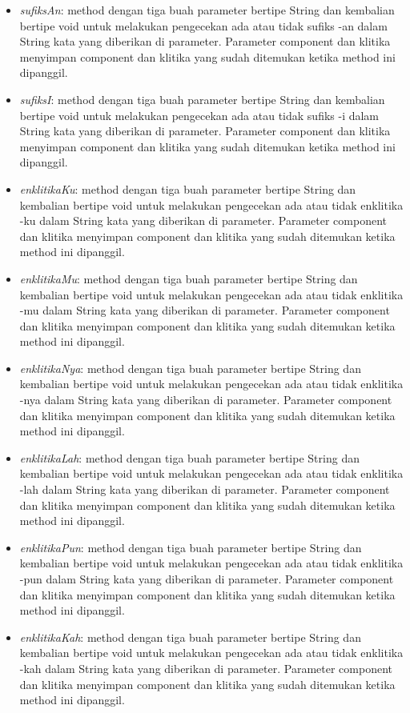 \begin{itemize}
	\item \textit{sufiksAn}: method dengan tiga buah parameter bertipe String dan kembalian bertipe void untuk melakukan pengecekan ada atau tidak sufiks -an dalam String kata yang diberikan di parameter. Parameter component dan klitika menyimpan component dan klitika yang sudah ditemukan ketika method ini dipanggil.
	\item \textit{sufiksI}: method dengan tiga buah parameter bertipe String dan kembalian bertipe void untuk melakukan pengecekan ada atau tidak sufiks -i dalam String kata yang diberikan di parameter. Parameter component dan klitika menyimpan component dan klitika yang sudah ditemukan ketika method ini dipanggil.
	\item \textit{enklitikaKu}: method dengan tiga buah parameter bertipe String dan kembalian bertipe void untuk melakukan pengecekan ada atau tidak enklitika -ku dalam String kata yang diberikan di parameter. Parameter component dan klitika menyimpan component dan klitika yang sudah ditemukan ketika method ini dipanggil.
	\item \textit{enklitikaMu}: method dengan tiga buah parameter bertipe String dan kembalian bertipe void untuk melakukan pengecekan ada atau tidak enklitika -mu dalam String kata yang diberikan di parameter. Parameter component dan klitika menyimpan component dan klitika yang sudah ditemukan ketika method ini dipanggil.
	\item \textit{enklitikaNya}: method dengan tiga buah parameter bertipe String dan kembalian bertipe void untuk melakukan pengecekan ada atau tidak enklitika -nya dalam String kata yang diberikan di parameter. Parameter component dan klitika menyimpan component dan klitika yang sudah ditemukan ketika method ini dipanggil.
	\item \textit{enklitikaLah}: method dengan tiga buah parameter bertipe String dan kembalian bertipe void untuk melakukan pengecekan ada atau tidak enklitika -lah dalam String kata yang diberikan di parameter. Parameter component dan klitika menyimpan component dan klitika yang sudah ditemukan ketika method ini dipanggil.
	\item \textit{enklitikaPun}: method dengan tiga buah parameter bertipe String dan kembalian bertipe void untuk melakukan pengecekan ada atau tidak enklitika -pun dalam String kata yang diberikan di parameter. Parameter component dan klitika menyimpan component dan klitika yang sudah ditemukan ketika method ini dipanggil.
	\item \textit{enklitikaKah}: method dengan tiga buah parameter bertipe String dan kembalian bertipe void untuk melakukan pengecekan ada atau tidak enklitika -kah dalam String kata yang diberikan di parameter. Parameter component dan klitika menyimpan component dan klitika yang sudah ditemukan ketika method ini dipanggil.

\end{itemize}
